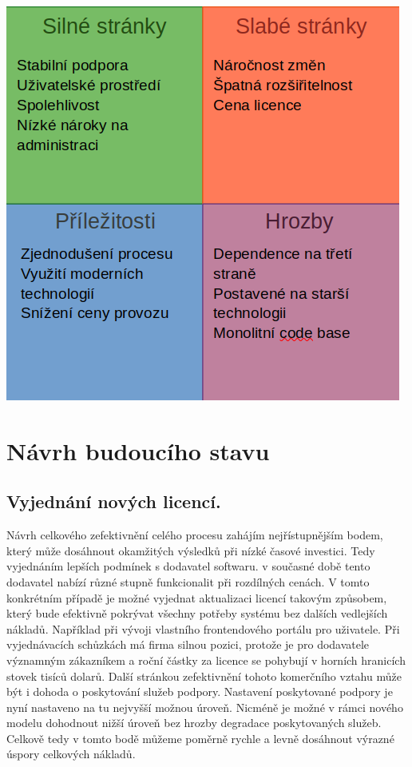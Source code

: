\documentclass[12pt]{article}
\begin{document}
\begin{sloppypar}
\begin{spacing}{1.15}
        \begin{center}
            \label{SWOT Analýza}
            \includegraphics[scale=0.5]{221129-PIS1-SWOT.png}
        \end{center}

        \section*{Návrh budoucího stavu}
        \subsection*{Vyjednání nových licencí.}

        Návrh celkového zefektivnění celého procesu zahájím nejřístupnějším
        bodem, který může dosáhnout okamžitých výsledků při nízké časové
        investici. Tedy vyjednáním lepších podmínek s dodavatel softwaru. v
        současné době tento dodavatel nabízí různé stupně funkcionalit při
        rozdílných cenách. V tomto konkrétním případě je možné vyjednat
        aktualizaci licencí takovým způsobem, který bude efektivně pokrývat
        všechny potřeby systému bez dalších vedlejších nákladů. Například při
        vývoji vlastního frontendového portálu pro uživatele. Při vyjednávacích
        schůzkách má firma silnou pozici, protože je pro dodavatele významným
        zákazníkem a roční částky za licence se pohybují v horních hranicích
        stovek tisíců dolarů. Další stránkou zefektivnění  tohoto komerčního 
        vztahu může být i dohoda o poskytování služeb podpory. Nastavení
        poskytované podpory je nyní nastaveno na tu nejvyšší možnou úroveň.
        Nicméně je možné v rámci nového modelu dohodnout nižší úroveň bez hrozby
        degradace poskytovaných služeb. Celkově tedy v tomto bodě můžeme poměrně
        rychle a levně dosáhnout výrazné úspory celkových nákladů.


\end{spacing}
\end{sloppypar}
\end{document}
